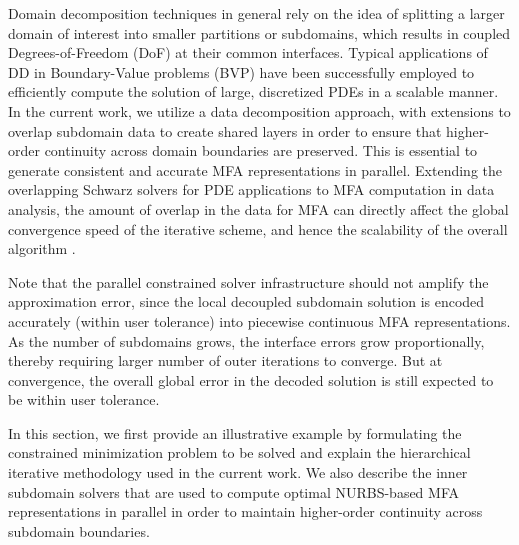 \documentclass[conference]{IEEEtran}
\begin{document}
Domain decomposition techniques in general rely on the idea of splitting a larger domain of interest into smaller partitions or subdomains, which results in coupled Degrees-of-Freedom (DoF) at their common interfaces. Typical applications of DD in Boundary-Value problems (BVP) \cite{smith-ddm, lions-asm} have been successfully employed to efficiently compute the solution of large, discretized PDEs in a scalable manner. In the current work, we utilize a data decomposition approach, with extensions to overlap subdomain data to create shared layers in order to ensure that higher-order continuity across domain boundaries are preserved. This is essential to generate consistent and accurate MFA representations in parallel. Extending the overlapping Schwarz solvers for PDE applications to MFA computation in data analysis, the amount of overlap in the data for MFA can directly affect the global convergence speed of the iterative scheme, and hence the scalability of the overall algorithm \cite{bjorstad-overlap-1989}. %

Note that the parallel constrained solver infrastructure should not amplify the approximation error, since the local decoupled subdomain solution is encoded accurately (within user tolerance) into piecewise continuous MFA representations. As the number of subdomains grows, the interface errors grow proportionally, thereby requiring larger number of outer iterations to converge. But at convergence, the overall global error in the decoded solution is still expected to be within user tolerance.

In this section, we first provide an illustrative example by formulating the constrained minimization problem to be solved and explain the hierarchical iterative methodology used in the current work. We also describe the inner subdomain solvers that are used to compute optimal NURBS-based MFA representations in parallel in order to maintain higher-order continuity across subdomain boundaries.


\end{document}
